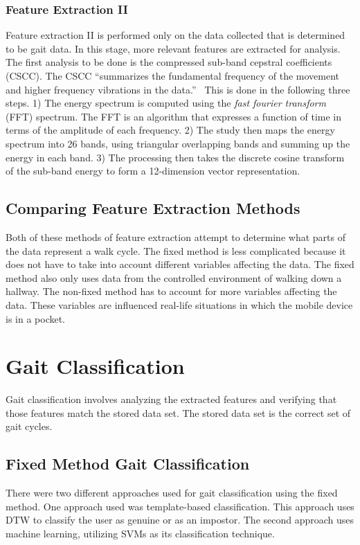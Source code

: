 \documentclass{sig-alternate}
\begin{document}
\subsubsection{Feature Extraction II}{
	Feature extraction II is performed only on the data collected that is determined to be gait data. In this stage, more relevant features are extracted for analysis. The first analysis to be done is the compressed sub-band cepstral coefficients (CSCC). The CSCC ``summarizes the fundamental frequency of the movement and higher frequency vibrations in the data.''~\cite{Lu:2014} This is done in the following three steps. 1) The energy spectrum is computed using the \textit{fast fourier transform} (FFT) spectrum. The FFT is an algorithm that expresses a function of time in terms of the amplitude of each frequency. 2) The study then maps the energy spectrum into 26 bands, using triangular overlapping bands and summing up the energy in each band. 3) The processing then takes the discrete cosine transform of the sub-band energy to form a 12-dimension vector representation.
}
\subsection{Comparing Feature Extraction Methods}
	Both of these methods of feature extraction attempt to determine what parts of the data represent a walk cycle. The fixed method is less complicated because it does not have to take into account different variables affecting the data. The fixed method also only uses data from the controlled environment of walking down a hallway. The non-fixed method has to account for more variables affecting the data. These variables are influenced real-life situations in which the mobile device is in a pocket.
	
\section{Gait Classification}
	Gait classification involves analyzing the extracted features and verifying that those features match the stored data set. The stored data set is the correct set of gait cycles. 


\subsection{Fixed Method Gait Classification}
There were two different approaches used for gait classification using the fixed method. One approach used was template-based classification. This approach uses DTW to classify the user as genuine or as an impostor. The second approach uses machine learning, utilizing SVMs as its classification technique. 
\end{document}
